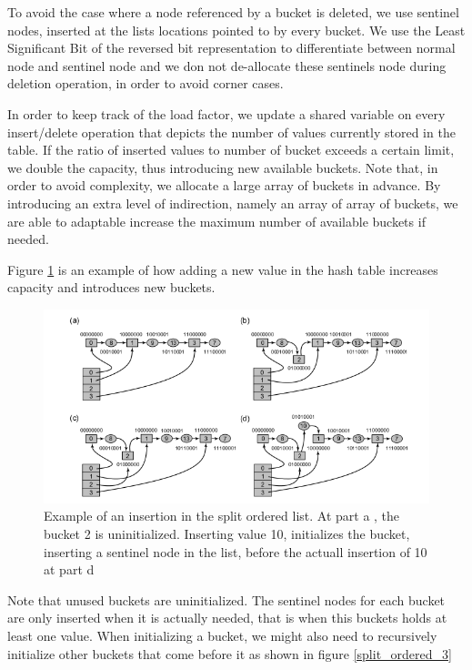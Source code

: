 To avoid the case where a node referenced by a bucket is deleted, we use sentinel nodes, inserted at the lists locations pointed to by every bucket. We use the Least Significant Bit of the reversed bit representation to differentiate between normal node and sentinel node and we don not de-allocate these sentinels node during deletion operation, in order to avoid corner cases.

In order to keep track of the load factor, we update a shared variable on every insert/delete operation that depicts the number of values currently stored in the table. If the ratio of inserted values to number of bucket exceeds a certain limit, we double the capacity, thus introducing new available buckets. Note that, in order to avoid complexity, we allocate a large array of buckets in advance. By introducing an extra level of indirection, namely an array of array of buckets, we are able to adaptable increase the maximum number of available buckets if needed.

Figure \ref{split_ordered_2} is an example of how adding a new value in the hash table increases capacity and introduces new buckets.

\begin{figure}
 \centering
  \includegraphics[scale=0.5]{split_ordered_2.png}
\caption{Example of an insertion in the split ordered list. At part a , the bucket 2 is uninitialized. Inserting value 10, initializes the bucket, inserting a sentinel node in the list, before the actuall insertion of 10 at part d}
\label{split_ordered_2}
\end{figure}

Note that unused buckets are uninitialized. The sentinel nodes for each bucket are only inserted when it is actually needed, that is when this buckets holds at least one value. When initializing a bucket, we might also need to recursively initialize other buckets that come before it as shown in figure \ref{split_ordered_3}

